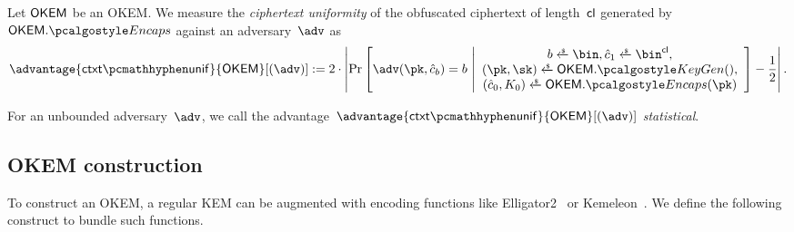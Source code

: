 \begin{definition}\label{def:ctxt-uniformity}
    Let $\mathsf{OKEM}$ be an OKEM.
    We measure the \emph{ciphertext uniformity} of the obfuscated ciphertext of length~$\mathsf{cl}$ generated by $\OKEM.\encaps$ against an adversary~$\adv$ as
    \[
        \advantage{\ctxtunif}{\OKEM}[(\adv)] := 
        2 \cdot \left|
        \Pr\left[
            \adv(\pk, \hat c_b) = b
        ~\middle|
            \begin{array}{c}
                b \getsr \bin, \hat c_1 \getsr \bin^{\obfctxtlen}, \\
                (\pk,\sk) \getsr \OKEM.\kgen(),\\
                (\hat c_0, K_0) \getsr \OKEM.\encaps(\pk)
            \end{array}
        \right]
        - \frac{1}{2}
        \right|.
    \]
    
    For an unbounded adversary~$\adv$, we call the advantage~$\advantage{\ctxtunif}{\OKEM}[(\adv)] $ \emph{statistical}.
\end{definition}

\subsection{OKEM construction}

To construct an OKEM, a regular KEM can be augmented with encoding functions like \textsf{Elligator2}~\cite{CCS:BHKL13} or \textsf{Kemeleon}~\cite[Sec. 2.4]{CCS:GunSteVei24}. We define the following construct to bundle such functions.

